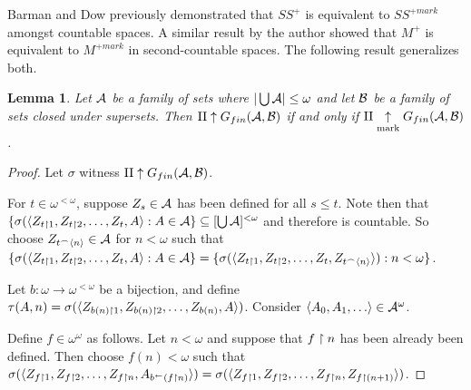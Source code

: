 \documentclass{amsart}
\theoremstyle{plain}
\newtheorem{lemma}[theorem]{Lemma}
\theoremstyle{definition}
\theoremstyle{remark}
\theoremstyle{plain}
\theoremstyle{definition}
\theoremstyle{remark}
\begin{document}
Barman and Dow
previously demonstrated that \(SS^+\) is equivalent to
\(SS^{+mark}\) amongst countable spaces.
A similar result by the author
showed that \(M^+\) is equivalent to \(M^{+mark}\) in second-countable
spaces. The following result generalizes both.

\begin{lemma}\label{mainLemma}
  Let \(\mathcal{A}\) be a family of sets where
  \(|\bigcup\mathcal{A}|\leq\omega\)
  and let \(\mathcal{B}\) be a family of sets closed under supersets. Then
  \(\mathrm{II}\uparrow G_{fin}(\mathcal{A},\mathcal{B})\) if and only if
  \(\mathrm{II}\underset{\text{mark}}{\uparrow}G_{fin}(\mathcal{A},\mathcal{B})\).
\end{lemma}

\begin{proof}
  Let \(\sigma\) witness \(\mathrm{II}\uparrow G_{fin}(\mathcal{A},\mathcal{B})\).

  For \(t\in\omega^{<\omega}\), suppose
  \(Z_s\in\mathcal{A}\) has been defined for all \(s\leq t\). Note then that
  \(
    \{\sigma(\langle Z_{t\restriction1},Z_{t\restriction2},\dots,Z_t,A\rangle:A\in\mathcal{A}\}
      \subseteq
    [\bigcup\mathcal{A}]^{<\omega}
  \)
  and therefore is countable.
  So choose \(Z_{t{^\frown}\langle n\rangle}\in\mathcal{A}\) for \(n<\omega\) such that
  \(
    \{\sigma(\langle Z_{t\restriction1},Z_{t\restriction2},\dots,Z_t,A\rangle:A\in\mathcal{A}\}
      =
    \{\sigma(\langle Z_{t\restriction1},Z_{t\restriction2},\dots,Z_t,Z_{t{^\frown}\langle n\rangle}\rangle):n<\omega\}
  \).

  Let \(b:\omega\to\omega^{<\omega}\) be a bijection,
  and define
  \(\tau(A,n)=\sigma(\langle Z_{b(n)\restriction 1},Z_{b(n)\restriction 2},\dots,Z_{b(n)},A\rangle)\).
  Consider \(\<A_0,A_1,\dots\>\in\mc A^\omega\).

  Define \(f\in\omega^\omega\) as follows.
  Let \(n<\omega\) and suppose that \(f\restriction n\) has been already
  been defined. Then choose \(f(n)<\omega\) such that
  \(
    \sigma(\langle Z_{f\restriction1},Z_{f\restriction2},\dots,Z_{f\restriction n},A_{b^{\leftarrow}(f\restriction n)}\rangle)
      =
    \sigma(\langle Z_{f\restriction1},Z_{f\restriction2},\dots,Z_{f\restriction n},Z_{f\restriction (n+1)}\rangle)
  \).


\end{proof}
\end{document}
